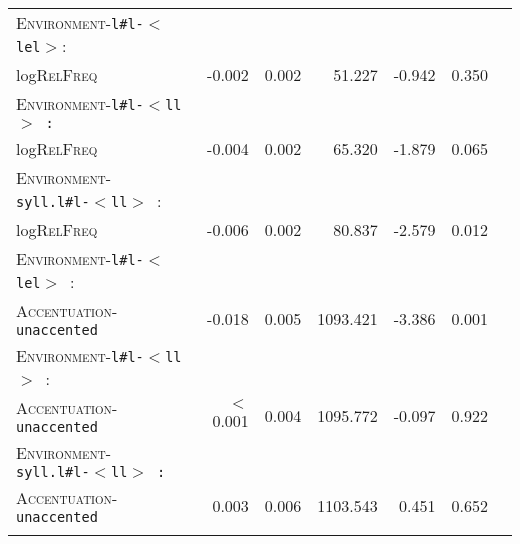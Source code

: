 \begin{table}
{\begin{tabular} {lrrrrrr}
		\textsc{Environment}-\texttt{l\#l-$<$lel$>$}: &&&&&\\
		log\textsc{RelFreq }& \color{lsLightGray}-0.002 &\color{lsLightGray} 0.002 & \color{lsLightGray}51.227 &\color{lsLightGray} -0.942 & \color{lsLightGray}0.350 \\ 
		
		\textsc{Environment}-\texttt{l\#l-$<$ll$>$ :}  &&&&&\\
		log\textsc{RelFreq }&\color{lsLightGray} -0.004 & \color{lsLightGray}0.002 &\color{lsLightGray} 65.320 & \color{lsLightGray}-1.879 &\color{lsLightGray} 0.065 \\ 
		
		\textsc{Environment}-\texttt{syll.l\#l-$<$ll$>$ }: &&&&&\\
		log\textsc{RelFreq }& -0.006 & 0.002 & 80.837 & -2.579 & 0.012 \\ 
		
		\textsc{Environment}-\texttt{l\#l-$<$lel$>$ }: &&&&&\\
		\textsc{Accentuation}-\texttt{unaccented} & -0.018 & 0.005 & 1093.421 & -3.386 & 0.001 \\ 
		
		\textsc{Environment}-\texttt{l\#l-$<$ll$>$ }: &&&&&\\
		\textsc{Accentuation}-\texttt{unaccented} & \color{lsLightGray}$<$0.001&\color{lsLightGray} 0.004 &\color{lsLightGray} 1095.772 & \color{lsLightGray}-0.097 & \color{lsLightGray}0.922 \\ 
		
		\textsc{Environment}-\texttt{syll.l\#l-$<$ll$>$ :} &&&&&\\
		\textsc{Accentuation}-\texttt{unaccented} &\color{lsLightGray} 0.003 & \color{lsLightGray}0.006 &\color{lsLightGray} 1103.543 & \color{lsLightGray}0.451 &\color{lsLightGray} 0.652 \\ 
	\lspbottomrule 
			\end{tabular}
}


\end{table}




